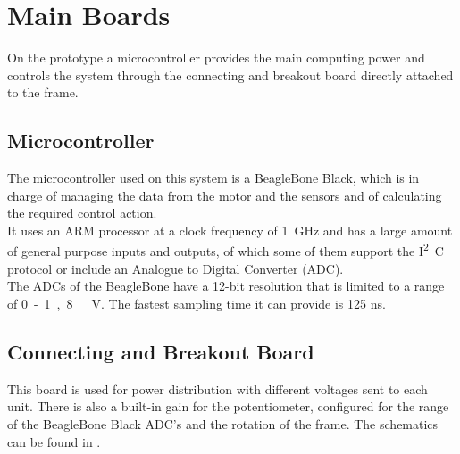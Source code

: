 \section{Main Boards}
On the prototype a microcontroller provides the main computing power and controls the system through the connecting and breakout board directly attached to the frame.

\subsection{Microcontroller}
The microcontroller used on this system is a BeagleBone Black, which is in charge of managing the data from the motor and the sensors and of calculating the required control action.\\
It uses an ARM processor at a clock frequency of \SI{1}{GHz} and has a large amount of general purpose inputs and outputs, of which some of them support the \si{I^2C} protocol or include an Analogue to Digital Converter (ADC).\\
The ADCs of the BeagleBone have a 12-bit resolution that is limited to a range of \si{0 - 1,8\ V}. The fastest sampling time it can provide is \si{125} \si{ns}\cite{Cameon}.

\subsection{Connecting and Breakout Board}
This board is used for power distribution with different voltages sent to each unit. There is also a built-in gain for the potentiometer, configured for the range of the BeagleBone Black ADC's and the rotation of the frame. The schematics can be found in .

